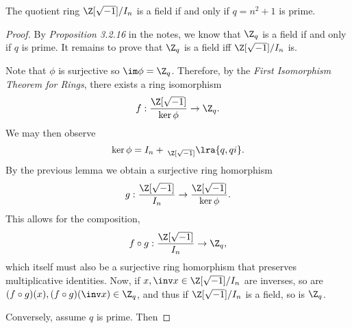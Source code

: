 \documentclass{article}
\begin{document}
\begin{claim*}[5]
   The quotient ring $\gaussint/I_n$ is a field if and only if $q=n^2+1$ is prime.
   \begin{proof}
      By \emph{Proposition 3.2.16} in the notes, we know that $\Z_q$ is a field if and only if $q$ is prime.
      It remains to prove that $\Z_q$ is a field iff $\gaussint/I_n$ is.

      Note that $\phi$ is surjective so $\im\phi=\Z_q$. Therefore, by the \emph{First Isomorphism
      Theorem for Rings}, there exists a ring isomorphism
      \begin{align*}
         f:\frac{\gaussint}{\ker\phi}\to\Z_q. 
      \end{align*}
      We may then observe
      \begin{align*}
         \ker\phi = I_n + \:_{\gaussint}\lra{q,qi}.
      \end{align*}
      By the previous lemma we obtain a surjective ring homorphism
      \begin{align*}
         g:\frac{\gaussint}{I_n}\to\frac{\gaussint}{\ker\phi}.
      \end{align*} 
      This allows for the composition,
      \begin{align*}
         f\circ g:\frac{\gaussint}{I_n}\to\Z_q,
      \end{align*}
      which itself must also be a surjective ring homorphism that preserves multiplicative
      identities.  Now, if $x,\inv x\in \gaussint/I_n$ are inverses, so are 
      $(f\circ g)(x),(f\circ g)(\inv x)\in\Z_q$, and thus if $\gaussint/I_n$ is a field, so 
      is $\Z_q$.

      Conversely, assume $q$ is prime. Then 
   \end{proof}
\end{claim*}
\end{document}
